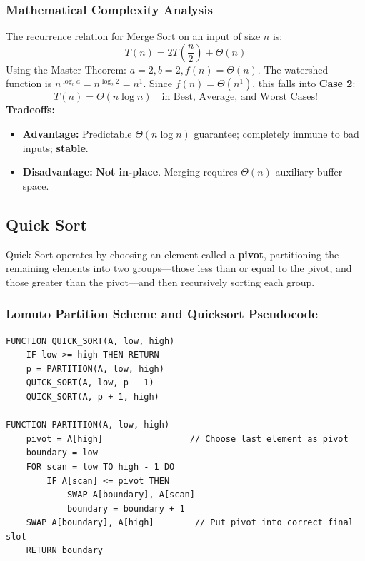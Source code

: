 \documentclass[11pt,a4paper]{article}
\begin{document}
\subsubsection{Mathematical Complexity Analysis}
The recurrence relation for Merge Sort on an input of size $n$ is:
\[
T(n) = 2 T\left(\frac{n}{2}\right) + \Theta(n)
\]
Using the Master Theorem: $a = 2, b = 2, f(n) = \Theta(n)$. The watershed function is $n^{\log_b a} = n^{\log_2 2} = n^1$. Since $f(n) = \Theta(n^1)$, this falls into \textbf{Case 2}:
\[
T(n) = \Theta(n \log n) \quad \text{in Best, Average, and Worst Cases!}
\]
\textbf{Tradeoffs:}
\begin{itemize}[itemsep=2pt]
    \item \textbf{Advantage:} Predictable $\Theta(n \log n)$ guarantee; completely immune to bad inputs; \textbf{stable}.
    \item \textbf{Disadvantage:} \textbf{Not in-place}. Merging requires $\Theta(n)$ auxiliary buffer space.
\end{itemize}

\subsection{Quick Sort}
Quick Sort operates by choosing an element called a \textbf{pivot}, partitioning the remaining elements into two groups—those less than or equal to the pivot, and those greater than the pivot—and then recursively sorting each group.

\subsubsection{Lomuto Partition Scheme and Quicksort Pseudocode}
\begin{lstlisting}[style=pseudostyle]
FUNCTION QUICK_SORT(A, low, high)
    IF low >= high THEN RETURN
    p = PARTITION(A, low, high)
    QUICK_SORT(A, low, p - 1)
    QUICK_SORT(A, p + 1, high)

FUNCTION PARTITION(A, low, high)
    pivot = A[high]                 // Choose last element as pivot
    boundary = low
    FOR scan = low TO high - 1 DO
        IF A[scan] <= pivot THEN
            SWAP A[boundary], A[scan]
            boundary = boundary + 1
    SWAP A[boundary], A[high]        // Put pivot into correct final slot
    RETURN boundary
\end{lstlisting}
\end{document}
